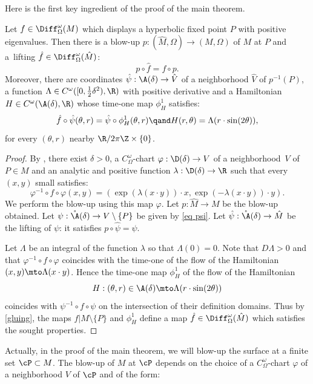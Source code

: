 Here is the first key ingredient of the proof of the main theorem.
\begin{theorem}\label{thm blow-up}
Let $f\in \Diff^\omega_\Omega(M)$ which displays a hyperbolic fixed point $P$ with positive eigenvalues.
Then there is a blow-up $p: (\hat M, \Omega)\to (M,\Omega)$ of $M$ at $P$ and a~lifting $\hat f\in \Diff^\omega_\Omega(\hat M)$:
\[p\circ \hat f= f\circ p.\]
Moreover, there are coordinates $\hat \psi: \A(\delta) \to \hat V$ of a neighborhood $\hat V$ of $p^{-1}(P)$,
a function $\Lambda\in C^\omega([0,\tfrac12 \delta^2),\R)$ with positive derivative and a Hamiltonian $H\in C^\omega (\A(\delta), \R)$ whose time-one map $\phi_H^1$ satisfies:
\[\hat f \circ \hat \psi(\theta, r) = \hat \psi\circ \phi_H^1(\theta,r) \qand H (r,\theta)= \Lambda (r \cdot \sin(2\theta)),\]
for every $(\theta,r)$ nearby $\R/2\pi \Z\times \{0\}$.

\end{theorem}
\begin{proof}
By \cite{Mo56}, there exist $\delta>0$, a $C^\omega_\Omega$-chart $\varphi: \D(\delta)\to V$ of a neighborhood~$V$ of~$P\in M$ and an analytic and positive function $\lambda: \D(\delta)\to \R $ such that every $(x,y)$ small satisfies:
\[\varphi^{-1}\circ f\circ \varphi (x,y)= (\exp(\lambda(x\cdot y)) \cdot x, \exp(-\lambda(x\cdot y))\cdot y).\]
We perform the blow-up using this map $\varphi$.
Let $p: \hat M \to M$ be the blow-up obtained. Let $\psi: \mathring \A(\delta)\to V\setminus \{P\}$ be given by \cref{eq psi}.
Let $\hat \psi: \mathring \A(\delta)\to \hat M$ be the lifting of $\psi$: it satisfies $p\circ \hat \psi= \psi$.

Let $\Lambda$ be an integral of the function $\lambda$ so that $\Lambda(0)=0$. Note that $D\Lambda>0$ and that $\varphi^{-1}\circ f\circ \varphi $ coincides with the time-one of the flow of the Hamiltonian $(x,y)\mto \Lambda (x\cdot y)$. Hence the time-one map $\phi_H^1$ of the flow of the Hamiltonian
\[H: (\theta, r)\in \A (\delta) \mto \Lambda(r\cdot \sin(2\theta))\]
coincides with $\psi^{-1}\circ f\circ \psi$ on the intersection of their definition domains. Thus by
\cref{gluing}, the maps $f|M\setminus \{P\}$ and
$\phi^1_H$ define a map $\hat f\in \Diff^\omega_\Omega(\hat M)$ which satisfies the sought properties.
\end{proof}
Actually, in the proof of the main theorem, we will blow-up the surface at a finite set $\cP\subset M$.
The blow-up of $M$ at $\cP$ depends on the choice of a $C^\omega_\Omega$-chart
$\varphi$ of a neighborhood $V$ of $\cP$ and of the form:
